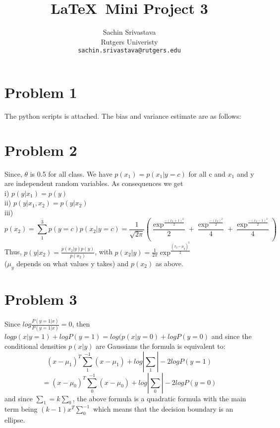 \documentclass[10pt,onecolumn,letterpaper]{article}
\begin{document}
\title{\LaTeX\ Mini Project 3}

\author{Sachin Srivastava\\
Rutgers Univeristy\\
{\tt\small sachin.srivastava@rutgers.edu}
}


\maketitle


\section{Problem 1}
The python scripts is attached. The bias and variance estimate are as follows:


\section{Problem 2}
Since, $\theta$ is 0.5 for all class. We have $p(x_1)=p(x_1|y=c)$ for all c and $x_1$ and y are independent random variables. As consequences we get\\
i)   $p(y|x_1) = p(y)$\\
ii)  $p(y|x_1,x_2) = p(y|x_2)$\\
iii)\\
$$
p(x_2) = \sum_1^3 p(y=c)p(x_2|y=c)
=\frac{1}{\sqrt{2\pi}}(\frac{\exp^\frac{-(x_2+1)^2}{2}}{2} + \frac{\exp^\frac{-(x_2)^2}{2}}{4} + \frac{\exp^\frac{-(x_2-1)^2}{2}}{4} )
$$
Thus, $p(y|x_2)=\frac{p(x_2|y)p(y)}{p(x_2)}$, with $p(x_2|y) = \frac{1}{2\pi}\exp^\frac{(x_2-\mu_y)^2}{2}$\\
($\mu_y$ depends on what values y takes) and $p(x_2)$ as above.


\section{Problem 3}
Since $log \frac{P(y=1|x)}{P(y=1|x)} =0$, then $log p(x|y = 1) + log P(y = 1) = log(p(x|y = 0) + log P(y = 0)$ and since the conditional densities $p(x|y)$ are Gaussians the formula is equivalent to:\\
$$
(x - \mu_1)^T\sum_1^{-1}(x-\mu_1)+ log |\sum_1| - 2 log P(y = 1) $$
$$
= (x - \mu_0)^T\sum_0^{-1}(x - \mu_0) + log |\sum_0| - 2 log P(y = 0)
$$
and since $\sum_1 = k\sum_0$, the above formula is a quadratic formula with the main term being $(k -1)x^T\sum_0^{-1}$ which means that the decision boundary is an ellipse.
\end{document}
